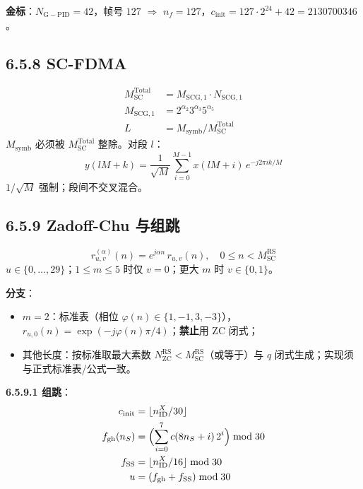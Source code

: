 \documentclass[11pt,a4paper]{ctexart}
\begin{document}
\textbf{金标}：$N_{\mathrm{G-PID}}{=}42$，帧号 $127$ $\Rightarrow$ $n_f{=}127$，$c_{\mathrm{init}}{=}127\cdot 2^{24}+42{=}2130700346$。

\subsection{6.5.8 SC-FDMA}

\begin{align}
M_{\mathrm{SC}}^{\mathrm{Total}} &= M_{\mathrm{SCG},1}\cdot N_{\mathrm{SCG},1}\\
M_{\mathrm{SCG},1} &= 2^{\alpha_2}3^{\alpha_3}5^{\alpha_5}\\
L &= M_{\mathrm{symb}}/M_{\mathrm{SC}}^{\mathrm{Total}}
\end{align}
$M_{\mathrm{symb}}$ 必须被 $M_{\mathrm{SC}}^{\mathrm{Total}}$ 整除。对段 $l$：
\begin{equation}
y(lM+k)=\frac{1}{\sqrt{M}}\sum_{i=0}^{M-1}x(lM+i)\,e^{-j2\pi ik/M}
\end{equation}
$1/\sqrt{M}$ 强制；段间不交叉混合。

\subsection{6.5.9 Zadoff-Chu 与组跳}

\begin{equation}
r_{u,v}^{(\alpha)}(n)=e^{j\alpha n}\,r_{u,v}(n),\quad 0\le n<M_{\mathrm{SC}}^{\mathrm{RS}}
\end{equation}
$u\in\{0,\ldots,29\}$；$1\le m\le 5$ 时仅 $v{=}0$；更大 $m$ 时 $v\in\{0,1\}$。

\textbf{分支}：
\begin{itemize}[nosep]
  \item $m{=}2$：标准表（相位 $\varphi(n)\in\{1,-1,3,-3\}$），$r_{u,0}(n)=\exp(-j\varphi(n)\pi/4)$；\textbf{禁止}用 ZC 闭式；
  \item 其他长度：按标准取最大素数 $N_{\mathrm{ZC}}^{\mathrm{RS}}<M_{\mathrm{SC}}^{\mathrm{RS}}$（或等于）与 $q$ 闭式生成；实现须与正式标准表/公式一致。
\end{itemize}

\textbf{6.5.9.1 组跳}：
\begin{align}
c_{\mathrm{init}}&=\lfloor n_{\mathrm{ID}}^X/30\rfloor\\
f_{\mathrm{gh}}(n_S)&=\Bigl(\sum_{i=0}^{7}c(8n_S+i)\,2^i\Bigr)\bmod 30\\
f_{\mathrm{SS}}&=\lfloor n_{\mathrm{ID}}^X/16\rfloor\bmod 30\\
u&=(f_{\mathrm{gh}}+f_{\mathrm{SS}})\bmod 30
\end{align}
\end{document}
